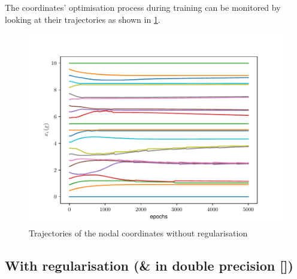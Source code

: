 The coordinates' optimisation process during training can be monitored by looking at their trajectories as shown in \cref{fig:Traj}.
\begin{figure}
    \centering
    \includegraphics[width=0.5\linewidth]{Figures/Trajectories.pdf}
    \caption{Trajectories of the nodal coordinates without regularisation}
    \label{fig:Traj}
\end{figure}



\subsection{With regularisation (\& in double precision [])}

